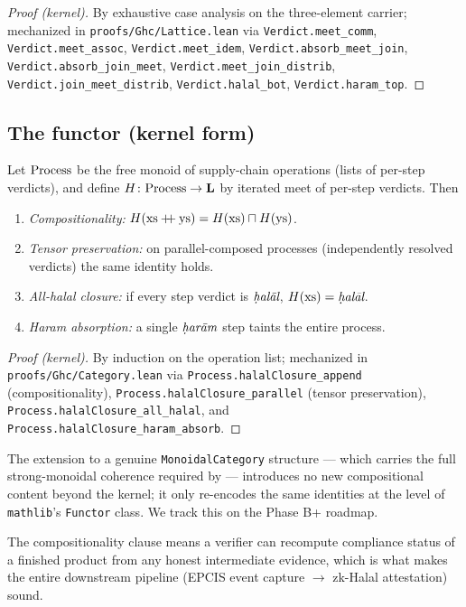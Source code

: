 \begin{proof}[Proof (kernel)]
By exhaustive case analysis on the three-element carrier; mechanized
in \texttt{proofs/Ghc/Lattice.lean} via
\texttt{Verdict.meet\_comm}, \texttt{Verdict.meet\_assoc},
\texttt{Verdict.meet\_idem}, \texttt{Verdict.absorb\_meet\_join},
\texttt{Verdict.absorb\_join\_meet},
\texttt{Verdict.meet\_join\_distrib},
\texttt{Verdict.join\_meet\_distrib},
\texttt{Verdict.halal\_bot}, \texttt{Verdict.haram\_top}.
\end{proof}

\subsection{The functor (kernel form)}

\begin{theorem}
\label{thm:hcf}
Let $\Process$ be the free monoid of supply-chain operations (lists
of per-step verdicts), and define
$\HCF \colon \Process \to \Lat$ by iterated meet of per-step
verdicts. Then
\begin{enumerate}[label=(H\arabic*)]
  \item \emph{Compositionality:}
        $\HCF(\mathrm{xs} \mathbin{+\!\!+} \mathrm{ys})
         = \HCF(\mathrm{xs}) \sqcap \HCF(\mathrm{ys})$.
  \item \emph{Tensor preservation:} on parallel-composed processes
        (independently resolved verdicts) the same identity holds.
  \item \emph{All-halal closure:} if every step verdict is $\halal$,
        $\HCF(\mathrm{xs}) = \halal$.
  \item \emph{Haram absorption:} a single $\haram$ step taints the
        entire process.
\end{enumerate}
\end{theorem}

\begin{proof}[Proof (kernel)]
By induction on the operation list; mechanized in
\texttt{proofs/Ghc/Cate\-gory.lean} via
\texttt{Process.halalClosure\_append} (compositionality),
\texttt{Process.halal\-Closure\_parallel} (tensor preservation),
\texttt{Process.halalClosure\_all\_halal}, and
\texttt{Process.halalClosure\_haram\_absorb}.
\end{proof}

\begin{remark}
The extension to a genuine \texttt{MonoidalCategory} structure ---
which carries the full strong-monoidal coherence required by
\cite{maclane,fongspivak} --- introduces no new compositional content
beyond the kernel; it only re-encodes the same identities at the
level of \texttt{mathlib}'s \texttt{Functor} class. We track this on
the Phase B+ roadmap.
\end{remark}

\begin{remark}
The compositionality clause means a verifier can recompute compliance
status of a finished product from any honest intermediate evidence,
which is what makes the entire downstream pipeline (EPCIS event
capture $\to$ zk-Halal attestation) sound.
\end{remark}
